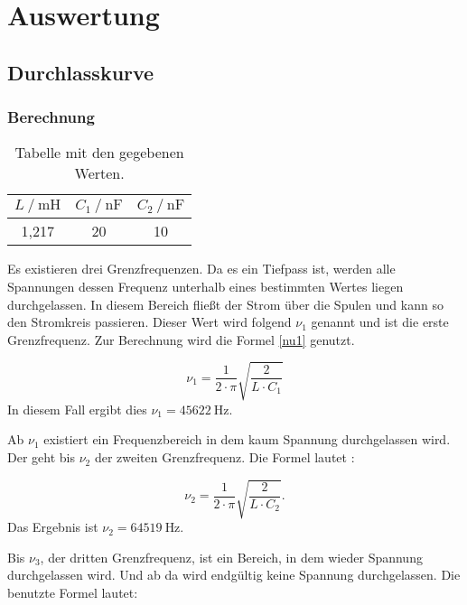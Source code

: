 \section{Auswertung}
\label{sec:Auswertung}

\subsection{Durchlasskurve}

\subsubsection{Berechnung}

\begin{table}
  \centering
  \caption{Tabelle mit den gegebenen Werten.}
  \label{tab:wertedurch}
  \begin{tabular}{c c c}
    \toprule
    $L \ /\ \si{\milli\henry}$ & $C_1 \ /\ \si{\nano\farad}$ & $C_2 \ /\ \si{\nano\farad}$ \\
    \midrule
    1,217 & 20 & 10\\
    \bottomrule
  \end{tabular}
\end{table}

Es existieren drei Grenzfrequenzen. Da es ein Tiefpass ist, werden alle Spannungen
dessen Frequenz unterhalb eines bestimmten Wertes liegen durchgelassen.
In diesem Bereich fließt der Strom über die Spulen und kann so den Stromkreis
passieren. Dieser Wert
wird folgend $\nu_1$ genannt und ist die erste Grenzfrequenz.
Zur Berechnung wird die Formel \eqref{nu1} genutzt.

\begin{equation}
  \nu_1 = \frac{1}{2\cdot\pi}\sqrt{\frac{2}{L \cdot C_1}}
\end{equation}
In diesem Fall ergibt dies $\nu_1 = \SI{45622}{\hertz}$.

Ab $\nu_1$ existiert ein Frequenzbereich in dem kaum Spannung durchgelassen wird.
Der geht bis $\nu_2$ der zweiten Grenzfrequenz. Die Formel lautet :

\begin{equation}
  \nu_2 = \frac{1}{2\cdot\pi}\sqrt{\frac{2}{L \cdot C_2}}.
\end{equation}
Das Ergebnis ist $\nu_2 = \SI{64519}{\hertz}$.

Bis $\nu_3$, der dritten Grenzfrequenz, ist ein Bereich, in dem wieder Spannung
durchgelassen wird. Und ab da wird endgültig keine Spannung durchgelassen. Die
benutzte Formel lautet:

